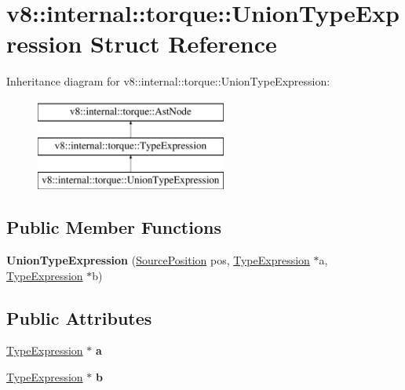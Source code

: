 \hypertarget{structv8_1_1internal_1_1torque_1_1UnionTypeExpression}{}\section{v8\+:\+:internal\+:\+:torque\+:\+:Union\+Type\+Expression Struct Reference}
\label{structv8_1_1internal_1_1torque_1_1UnionTypeExpression}
Inheritance diagram for v8\+:\+:internal\+:\+:torque\+:\+:Union\+Type\+Expression\+:\begin{figure}[H]
\begin{center}
\leavevmode
\includegraphics[height=3.000000cm]{structv8_1_1internal_1_1torque_1_1UnionTypeExpression}
\end{center}
\end{figure}
\subsection*{Public Member Functions}
\begin{DoxyCompactItemize}
\item 
\mbox{\label{structv8_1_1internal_1_1torque_1_1UnionTypeExpression_adbb5d955cacb605419516ec6c16a3feb}} 
{\bfseries Union\+Type\+Expression} (\mbox{\hyperlink{structv8_1_1internal_1_1torque_1_1SourcePosition}{Source\+Position}} pos, \mbox{\hyperlink{structv8_1_1internal_1_1torque_1_1TypeExpression}{Type\+Expression}} $\ast$a, \mbox{\hyperlink{structv8_1_1internal_1_1torque_1_1TypeExpression}{Type\+Expression}} $\ast$b)
\end{DoxyCompactItemize}
\subsection*{Public Attributes}
\begin{DoxyCompactItemize}
\item 
\mbox{\label{structv8_1_1internal_1_1torque_1_1UnionTypeExpression_a65f54beebcbe4dbb075ff525e9550f6f}} 
\mbox{\hyperlink{structv8_1_1internal_1_1torque_1_1TypeExpression}{Type\+Expression}} $\ast$ {\bfseries a}
\item 
\mbox{\label{structv8_1_1internal_1_1torque_1_1UnionTypeExpression_a9abe3d4038fcbaf1e6c24cafb626ff52}} 
\mbox{\hyperlink{structv8_1_1internal_1_1torque_1_1TypeExpression}{Type\+Expression}} $\ast$ {\bfseries b}
\end{DoxyCompactItemize}
